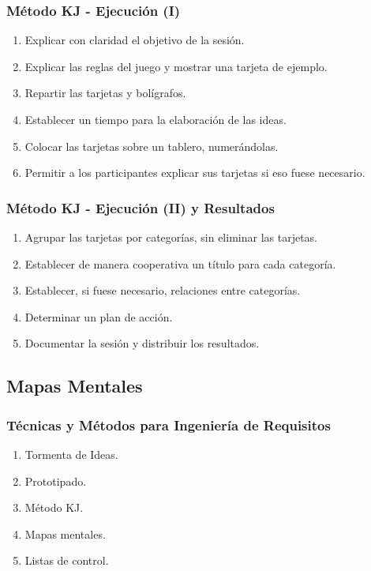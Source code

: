 ﻿\documentclass[handout,a4paper,slidestop,xcolor=pst,dvips,blue]{beamer}
\begin{document}
\begin{frame}[c]
    \frametitle{Método KJ - Ejecución (I)}
    \begin{enumerate}[<+->]
        \item Explicar con claridad el objetivo de la sesión.
        \item Explicar las reglas del juego y mostrar una tarjeta de ejemplo.
        \item Repartir las tarjetas y bolígrafos.
        \item Establecer un tiempo para la elaboración de las ideas.
        \item Colocar las tarjetas sobre un tablero, numerándolas.
        \item Permitir a los participantes explicar sus tarjetas si eso fuese necesario.
    \end{enumerate}
\end{frame}

\begin{frame}[c]
    \frametitle{Método KJ - Ejecución (II) y Resultados}
    \begin{enumerate}[<+->]
        \item Agrupar las tarjetas por categorías, sin eliminar las tarjetas.
        \item Establecer de manera cooperativa un título para cada categoría.
        \item Establecer, si fuese necesario, relaciones entre categorías.
        \item Determinar un plan de acción.
        \item Documentar la sesión y distribuir los resultados.
    \end{enumerate}
\end{frame}

\subsection{Mapas Mentales}

\begin{frame}[c]
    \frametitle{Técnicas y Métodos para Ingeniería de Requisitos}
    \begin{enumerate}
         \item Tormenta de Ideas.
         \item Prototipado.
         \item Método KJ.
         \item \alert{Mapas mentales}.
         \item Listas de control.
    \end{enumerate}
\end{frame}
\end{document}
